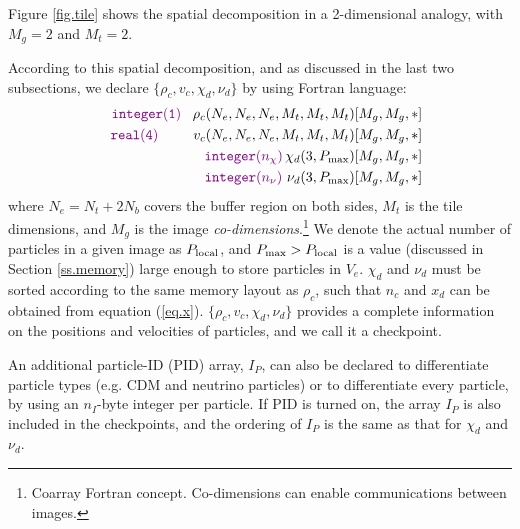 \documentclass[10pt,twocolumn,reprint]{emulateapj}
\newcommand{\bs}{\boldsymbol}
\newcommand{\tcv}{\textcolor{violet}}
\begin{document}
Figure \ref{fig.tile} shows the spatial decomposition in a 2-dimensional analogy, with $M_g=2$ and $M_t=2$.

According to this spatial decomposition, and as discussed in the last two subsections, we declare $\{\rho_c,v_c,\chi_d,\nu_d\}$ by using Fortran language:
\begin{eqnarray*}
	&&\tcv{{\tt integer(1)}}\ \ \, \rho_c(N_e,N_e,N_e,M_t,M_t,M_t)[M_g,M_g,*]\\
	&&\tcv{{\tt real(4)}}\ \ \ \ \ \ \ \, v_c(N_e,N_e,N_e,M_t,M_t,M_t)[M_g,M_g,*]\\
	&&\tcv{{\tt integer(}n_\chi{\tt )}}\, \chi_d(3,P_{\rm max})[M_g,M_g,*]\\
	&&\tcv{{\tt integer(}n_\nu{\tt )}}\ \nu_d(3,P_{\rm max})[M_g,M_g,*]
\end{eqnarray*}
where $N_e=N_t+2N_b$ covers the buffer region on both sides, $M_t$ is the tile dimensions, and $M_g$ is the image {\it co-dimensions}.\footnote{Coarray Fortran concept. Co-dimensions can enable communications between images.} We denote the actual number of particles in a given image as $P_{\rm local}$, and $P_{\rm max}>P_{\rm local}$ is a value (discussed in Section \ref{ss.memory}) large enough to store particles in $V_e$. $\chi_d$ and $\nu_d$
must be sorted according to the same memory layout as $\rho_c$, such that $n_c$ and $x_d$ can be obtained from equation (\ref{eq.x}).
$\{\rho_c,v_c,\chi_d,\nu_d\}$ provides a complete information on the positions and velocities of particles, and we call it a checkpoint.

An additional particle-ID (PID) array, $I_P$, can also be declared to differentiate particle types (e.g. CDM and neutrino particles) or to differentiate every particle, by using an $n_I$-byte integer per particle. If PID is turned on, the array $I_P$ is also included in the checkpoints, and the ordering of $I_P$ is the same as that for $\chi_d$ and $\nu_d$.
\end{document}
